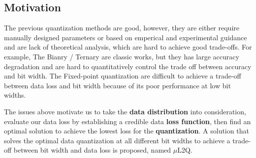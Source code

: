 \subsection{Motivation}
The previous quantization methods are good, however, they are either require manually designed parameters or based on emperical and experimental guidance and are lack of theoretical analysis, which are hard to achieve good trade-offs. 
For example, The Bianry \citep{hubara2016binarized} / Ternary \citep{TWNs} are classic works, but they has large accuracy degradation and are hard to quantitatively control the trade off between accuracy and bit width.
The Fixed-point quantization \citep{gysel2016hardware,zhou2016dorefa} are difficult to achieve a trade-off between data loss and bit width because of its poor performance at low bit widths.

The issues above motivate us to take the \textbf{data distribution} into consideration, evaluate our data loss by establishing a credible data \textbf{loss function}, then find an optimal solution to achieve the lowest loss for the \textbf{quantization}.
A solution that solves the optimal data quantization at all different bit widths to achieve a trade-off between bit width and data loss is proposed, named $\mu$L2Q.

